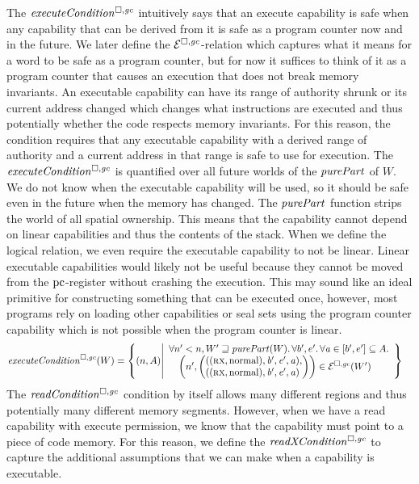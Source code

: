 \begin{jversion}
The $\execCond{}$ intuitively says that an execute capability is safe when any capability that can be derived from it is safe as a program counter now and in the future.
We later define the $\mathcal{E}^{\square,\mathit{gc}}$-relation which captures what it means for a word to be safe as a program counter, but for now it suffices to think of it as a program counter that causes an execution that does not break memory invariants.
An executable capability can have its range of authority shrunk or its current address changed which changes what instructions are executed and thus potentially whether the code respects memory invariants.
For this reason, the condition requires that any executable capability with a derived range of authority and a current address in that range is safe to use for execution.
The $\execCond{}$ is quantified over all future worlds of the $\purePart{}$ of $W$.
We do not know when the executable capability will be used, so it should be safe even in the future when the memory has changed.
The $\purePart{}$ function strips the world of all spatial ownership.
This means that the capability cannot depend on linear capabilities and thus the contents of the stack.
When we define the logical relation, we even require the executable capability to not be linear.
Linear executable capabilities would likely not be useful because they cannot be moved from the $\mathrm{pc}$-register without crashing the execution.
This may sound like an ideal primitive for constructing something that can be executed once, however, most programs rely on loading other capabilities or seal sets using the program counter capability which is not possible when the program counter is linear.
\begin{align*}
  \execCond{W} &=
  \left\{ \npair{A} \middle|
    \begin{array}{l}
      \forall n' < n, W' \future \purePart{W}\ldotp \forall b',e'\ldotp \forall \aaddr \in [b',e'] \subseteq A \ldotp\\
      \quad \npair[n']{\left( \arraycolsep=0pt\array{l}((\rx,\normal),\baddr',\eaddr',\aaddr),\\((\rx,\normal),\baddr',\eaddr',\aaddr)\endarray\right)} \in \lre(W')
    \end{array}
    \right\}
\end{align*}
The $\readCond{}$ condition by itself allows many different regions and thus potentially many different memory segments.
However, when we have a read capability with execute permission, we know that the capability must point to a piece of code memory.
For this reason, we define the $\xReadCond{}$ to capture the additional assumptions that we can make when a capability is executable.

\end{jversion}
